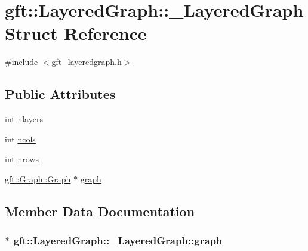 \hypertarget{structgft_1_1LayeredGraph_1_1__LayeredGraph}{}\section{gft\+:\+:Layered\+Graph\+:\+:\+\_\+\+Layered\+Graph Struct Reference}
\label{structgft_1_1LayeredGraph_1_1__LayeredGraph}


{\ttfamily \#include $<$gft\+\_\+layeredgraph.\+h$>$}

\subsection*{Public Attributes}
\begin{DoxyCompactItemize}
\item 
int \hyperlink{structgft_1_1LayeredGraph_1_1__LayeredGraph_a4d939ee4001d3f04c6aa7b3b50497983}{nlayers}
\item 
int \hyperlink{structgft_1_1LayeredGraph_1_1__LayeredGraph_a5eeae6a98de252cadbb5837e6d214bc9}{ncols}
\item 
int \hyperlink{structgft_1_1LayeredGraph_1_1__LayeredGraph_a27cf4d0997e25e7a8602016b663091c2}{nrows}
\item 
\hyperlink{namespacegft_1_1Graph_a95acabdf6e7f5b884255558bef5d3f8b}{gft\+::\+Graph\+::\+Graph} $\ast$ \hyperlink{structgft_1_1LayeredGraph_1_1__LayeredGraph_a34e087f0393ecd46ce766bc4dd1b85a5}{graph}
\end{DoxyCompactItemize}


\subsection{Member Data Documentation}
\subsubsection[{\texorpdfstring{graph}{graph}}]{$\ast$ gft\+::\+Layered\+Graph\+::\+\_\+\+Layered\+Graph\+::graph}\hypertarget{structgft_1_1LayeredGraph_1_1__LayeredGraph_a34e087f0393ecd46ce766bc4dd1b85a5}{}\label{structgft_1_1LayeredGraph_1_1__LayeredGraph_a34e087f0393ecd46ce766bc4dd1b85a5}
